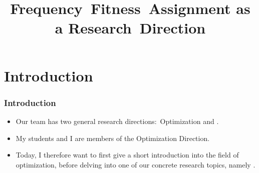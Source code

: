 \documentclass[aspectratio=169,mathserif,notheorems]{beamer}%
\title{\mbox{Frequency Fitness Assignment} as a \mbox{Research Direction}}%
\begin{document}
%
\startPresentation%
%
\section{Introduction}%
%
\begin{frame}%
\frametitle{Introduction}%
\begin{itemize}%
%
\item Our team has two general research directions:~Optimization\cite{W2009GOATAA} and .%
%
\item<2-> My students and I are members of the \alert{Optimization Direction}.%
%
\item<3-> Today, I therefore want to first give a short introduction into the field of optimization, before delving into one of our concrete research topics, namely .%
%
\end{itemize}%
\end{frame}%
%
\end{document}
